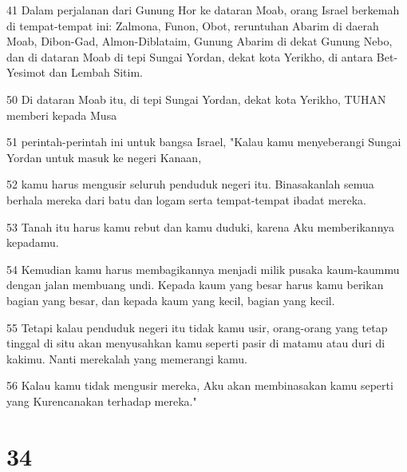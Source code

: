 \par 41 Dalam perjalanan dari Gunung Hor ke dataran Moab, orang Israel berkemah di tempat-tempat ini: Zalmona, Funon, Obot, reruntuhan Abarim di daerah Moab, Dibon-Gad, Almon-Diblataim, Gunung Abarim di dekat Gunung Nebo, dan di dataran Moab di tepi Sungai Yordan, dekat kota Yerikho, di antara Bet-Yesimot dan Lembah Sitim.
\par 50 Di dataran Moab itu, di tepi Sungai Yordan, dekat kota Yerikho, TUHAN memberi kepada Musa
\par 51 perintah-perintah ini untuk bangsa Israel, "Kalau kamu menyeberangi Sungai Yordan untuk masuk ke negeri Kanaan,
\par 52 kamu harus mengusir seluruh penduduk negeri itu. Binasakanlah semua berhala mereka dari batu dan logam serta tempat-tempat ibadat mereka.
\par 53 Tanah itu harus kamu rebut dan kamu duduki, karena Aku memberikannya kepadamu.
\par 54 Kemudian kamu harus membagikannya menjadi milik pusaka kaum-kaummu dengan jalan membuang undi. Kepada kaum yang besar harus kamu berikan bagian yang besar, dan kepada kaum yang kecil, bagian yang kecil.
\par 55 Tetapi kalau penduduk negeri itu tidak kamu usir, orang-orang yang tetap tinggal di situ akan menyusahkan kamu seperti pasir di matamu atau duri di kakimu. Nanti merekalah yang memerangi kamu.
\par 56 Kalau kamu tidak mengusir mereka, Aku akan membinasakan kamu seperti yang Kurencanakan terhadap mereka."

\chapter{34}

